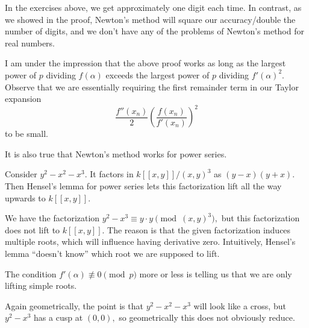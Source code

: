 \documentclass[../notes.tex]{subfiles}
\begin{document}
\begin{remark}
	In the exercises above, we get approximately one digit each time. In contrast, as we showed in the proof, Newton's method will square our accuracy/double the number of digits, and we don't have any of the problems of Newton's method for real numbers.
\end{remark}
\begin{remark}[Nir]
	I am under the impression that the above proof works as long as the largest power of $p$ dividing $f(\alpha)$ exceeds the largest power of $p$ dividing $f'(\alpha)^2.$ Observe that we are essentially requiring the first remainder term in our Taylor expansion
	\[\frac{f''(x_n)}2\left(\frac{f(x_n)}{f'(x_n)}\right)^2\]
	to be small.
\end{remark}
It is also true that Newton's method works for power series.
\begin{example}
	Consider $y^2-x^2-x^3.$ It factors in $k[[x,y]]/(x,y)^3$ as $(y-x)(y+x).$ Then Hensel's lemma for power series lets this factorization lift all the way upwards to $k[[x,y]].$
\end{example}
\begin{nex}
	We have the factorization $y^2-x^3\equiv y\cdot y\pmod{(x,y)^3},$ but this factorization does not lift to $k[[x,y]].$ The reason is that the given factorization induces multiple roots, which will influence having derivative zero. Intuitively, Hensel's lemma ``doesn't know'' which root we are supposed to lift.
\end{nex}
\begin{remark}
	The condition $f'(\alpha)\not\equiv0\pmod p$ more or less is telling us that we are only lifting simple roots.
\end{remark}
Again geometrically, the point is that $y^2-x^2-x^3$ will look like a cross, but $y^2-x^3$ has a cusp at $(0,0),$ so geometrically this does not obviously reduce.
\end{document}
